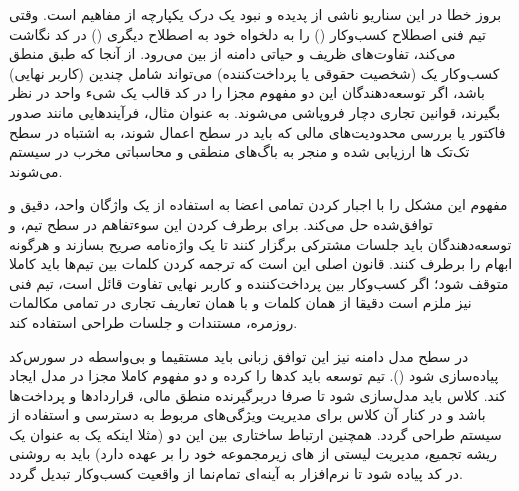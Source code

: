 بروز خطا در این سناریو ناشی از پدیده  و نبود یک درک یکپارچه از مفاهیم است. وقتی تیم فنی اصطلاح کسب‌وکار () را به دلخواه خود به اصطلاح دیگری () در کد نگاشت می‌کند، تفاوت‌های ظریف و حیاتی دامنه از بین می‌رود. از آنجا که طبق منطق کسب‌وکار یک  (شخصیت حقوقی یا پرداخت‌کننده) می‌تواند شامل چندین  (کاربر نهایی) باشد، اگر توسعه‌دهندگان این دو مفهوم مجزا را در کد قالب یک شیء واحد در نظر بگیرند، قوانین تجاری دچار فروپاشی می‌شوند. به عنوان مثال، فرآیندهایی مانند صدور فاکتور یا بررسی محدودیت‌های مالی که باید در سطح  اعمال شوند، به اشتباه در سطح تک‌تک ها ارزیابی شده و منجر به باگ‌های منطقی و محاسباتی مخرب در سیستم می‌شوند.

مفهوم  این مشکل را با اجبار کردن تمامی اعضا به استفاده از یک واژگان واحد، دقیق و توافق‌شده حل می‌کند. برای برطرف کردن این سوءتفاهم در سطح تیم،  و توسعه‌دهندگان باید جلسات مشترکی برگزار کنند تا یک واژه‌نامه صریح بسازند و هرگونه ابهام را برطرف کنند. قانون اصلی این است که ترجمه کردن کلمات بین تیم‌ها باید کاملا متوقف شود؛ اگر کسب‌وکار بین پرداخت‌کننده و کاربر نهایی تفاوت قائل است، تیم فنی نیز ملزم است دقیقا از همان کلمات  و  با همان تعاریف تجاری در تمامی مکالمات روزمره، مستندات و جلسات طراحی استفاده کند.

در سطح مدل دامنه نیز این توافق زبانی باید مستقیما و بی‌واسطه در سورس‌کد پیاده‌سازی شود (). تیم توسعه باید کدها را  کرده و دو مفهوم کاملا مجزا در مدل ایجاد کند. کلاس  باید مدل‌سازی شود تا صرفا دربرگیرنده منطق مالی، قراردادها و پرداخت‌ها باشد و در کنار آن کلاس  برای مدیریت ویژگی‌های مربوط به دسترسی و استفاده از سیستم طراحی گردد. همچنین ارتباط ساختاری بین این دو (مثلا اینکه یک  به عنوان یک ریشه تجمیع، مدیریت لیستی از های زیرمجموعه خود را بر عهده دارد) باید به روشنی در کد پیاده شود تا نرم‌افزار به آینه‌ای تمام‌نما از واقعیت کسب‌وکار تبدیل گردد.